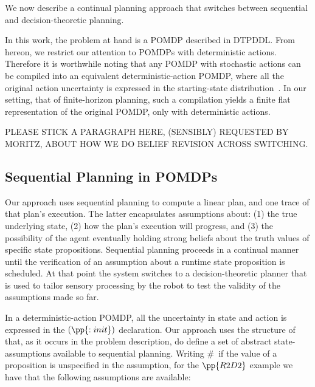 

We now describe a continual planning approach that switches between
sequential and decision-theoretic planning. 


In this work, the problem at hand is a POMDP described in DTPDDL. From
hereon, we restrict our attention to POMDPs with deterministic
actions. Therefore it is worthwhile noting that any POMDP with
stochastic actions can be compiled into an equivalent
deterministic-action POMDP, where all the original action uncertainty
is expressed in the starting-state
distribution~\cite{ng:Jordan:2000}. In our setting, that of
finite-horizon planning, such a compilation yields a finite flat
representation of the original POMDP, only with deterministic
actions. 


PLEASE STICK A PARAGRAPH HERE, (SENSIBLY) REQUESTED BY MORITZ, ABOUT
HOW WE DO BELIEF REVISION ACROSS SWITCHING.


\subsection{Sequential Planning in POMDPs}


Our approach uses sequential planning to compute a linear plan, and
one trace of that plan's execution. The latter encapsulates
assumptions about: (1) the true underlying state, (2) how the plan's
execution will progress, and (3) the possibility of the agent
eventually holding strong beliefs about the truth values of specific
state propositions. Sequential planning proceeds in a continual manner
until the verification of an assumption about a runtime state
proposition is scheduled. At that point the system switches to a
decision-theoretic planner that is used to tailor sensory processing
by the robot to test the validity of the assumptions made so far.

In a deterministic-action POMDP, all the uncertainty in state and
action is expressed in the $(\pp{:init})$ declaration. Our approach
uses the structure of that, as it occurs in the problem description,
do define a set of abstract state-assumptions available to 
sequential planning.  
Writing \#\ if the value of a proposition is unspecified in the
assumption, for the $\pp{R2D2}$ example we have that the following
assumptions are available:


